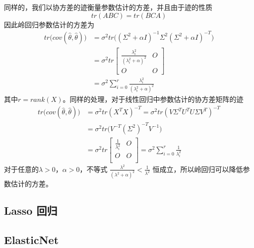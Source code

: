 同样的，我们以协方差的迹衡量参数估计的方差，并且由于迹的性质
\begin{equation}
	tr(ABC) = tr(BCA)
\end{equation}
因此岭回归参数估计的方差为
\begin{equation}
\begin{split}
	tr\big(cov(\hat{\theta}, \hat{\theta})\big) &= \sigma^2 
	tr\big(
	(\Sigma^2 + \alpha I)^{-1}
	\Sigma^2
	(\Sigma^2 + \alpha I)^{-T}
	\big) \\ 
	&= \sigma^2 tr
	\begin{bmatrix}
	\frac{\lambda_i^2}{(\lambda_i^2 + \alpha)^2} & O \\
	O  &  O
	\end{bmatrix}\\
	&= \sigma^2 \sum_{i=0}^r \frac{\lambda_i^2}{(\lambda_i^2 + \alpha)^2}
\end{split}
\end{equation}
其中$r = rank(X)$。同样的处理，对于线性回归中参数估计的协方差矩阵的迹
\begin{equation}
\begin{split}
	tr\big(cov(\hat{\theta}, \hat{\theta})\big) &= \sigma^2tr(X^TX)^{-T} = \sigma^2 tr(V\Sigma^TU^T U\Sigma V^T)^{-T}\\
	&= \sigma^2 tr\big(V^{-T}(\Sigma^2)^{-T} V^{-1}\big) \\
	&= \sigma^2 tr \begin{bmatrix}
	\frac{1}{\lambda_i^2} & O \\
	O & O \\
	\end{bmatrix} = \sigma^2 \sum_{i=0}^r \frac{1}{\lambda_i^2}
\end{split}
\end{equation}
对于任意的$\lambda > 0$，$\alpha > 0$，不等式
$\frac{\lambda^2}{(\lambda^2 + \alpha)^ 2} < \frac{1}{\lambda^2}$
恒成立，所以岭回归可以降低参数估计的方差。










\subsection{Lasso 回归} %
\label{sub:lasso_回归}




\subsection{ElasticNet} %
\label{sub:elasticnet}

